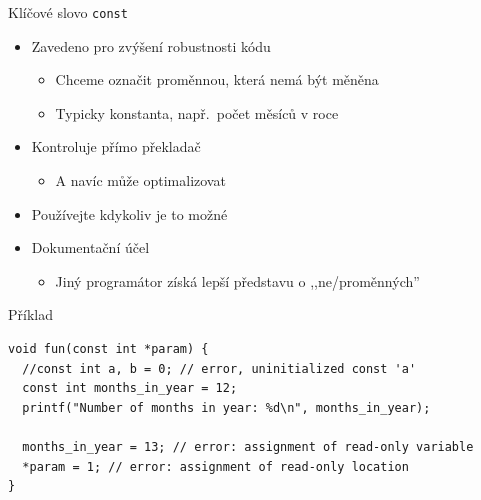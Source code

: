 \begin{frame}[fragile]{Klíčové slovo \texttt{const}}

  \begin{itemize}
    \item Zavedeno pro zvýšení robustnosti kódu
    \begin{itemize}
      \item Chceme označit proměnnou, která nemá být měněna
      \item Typicky konstanta, např.\ počet měsíců v roce
    \end{itemize}

    \pause

    \item Kontroluje přímo překladač
    \pause
    \begin{itemize}
      \item A navíc může optimalizovat
    \end{itemize}

    \pause

    \item Používejte kdykoliv je to možné

    \pause

    \item Dokumentační účel
    \begin{itemize}
      \item Jiný programátor získá lepší představu o ,,ne/proměnných''
    \end{itemize}

  \end{itemize}

  \pause

\begin{block}{Příklad}
\begin{lstlisting}
void fun(const int *param) {
  //const int a, b = 0; // error, uninitialized const 'a'
  const int months_in_year = 12;
  printf("Number of months in year: %d\n", months_in_year);

  months_in_year = 13; // error: assignment of read-only variable
  *param = 1; // error: assignment of read-only location
}
\end{lstlisting} %
\end{block}

\end{frame}

